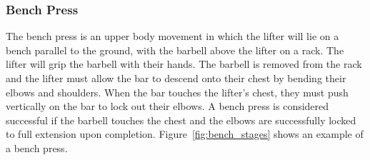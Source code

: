 \subsubsection{Bench Press}

The bench press is an upper body movement in which the lifter will lie on a bench parallel to the ground, with the barbell above the lifter on a rack. The lifter will grip the barbell with their hands. The barbell is removed from the rack and the lifter must allow the bar to descend onto their chest by bending their elbows and shoulders. When the bar touches the lifter's chest, they must push vertically on the bar to lock out their elbows. A bench press is considered successful if the barbell touches the chest and the elbows are successfully locked to full extension upon completion. Figure~\ref{fig:bench_stages} shows an example of a bench press.

